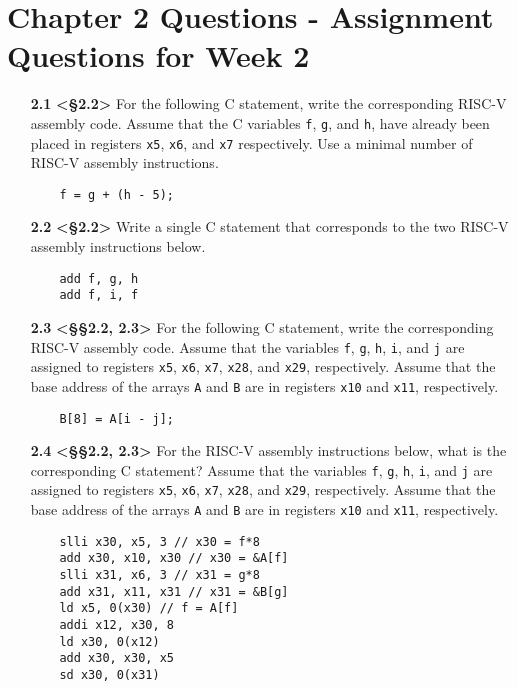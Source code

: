 \documentclass[11pt]{article}
\begin{document}
\section*{Chapter 2 Questions - Assignment Questions for Week 2}

\begin{enumerate}
    \item[\textbf{2.1}] \textbf{<§2.2>} For the following C statement, write the corresponding RISC-V 
    assembly code. Assume that the C variables \texttt{f}, \texttt{g}, and \texttt{h}, have already been placed 
    in registers \texttt{x5}, \texttt{x6}, and \texttt{x7} respectively. Use a minimal number of RISC-V assembly 
    instructions.
    \begin{verbatim}
    f = g + (h - 5);
    \end{verbatim}

    \item[\textbf{2.2}] \textbf{<§2.2>} Write a single C statement that corresponds to the two RISC-V 
    assembly instructions below.
    \begin{verbatim}
    add f, g, h
    add f, i, f
    \end{verbatim}

    \item[\textbf{2.3}] \textbf{<§§2.2, 2.3>} For the following C statement, write the corresponding 
    RISC-V assembly code. Assume that the variables \texttt{f}, \texttt{g}, \texttt{h}, \texttt{i}, and \texttt{j} are assigned to 
    registers \texttt{x5}, \texttt{x6}, \texttt{x7}, \texttt{x28}, and \texttt{x29}, respectively. Assume that the base address 
    of the arrays \texttt{A} and \texttt{B} are in registers \texttt{x10} and \texttt{x11}, respectively.
    \begin{verbatim}
    B[8] = A[i - j];
    \end{verbatim}

    \item[\textbf{2.4}] \textbf{<§§2.2, 2.3>} For the RISC-V assembly instructions below, what is the 
    corresponding C statement? Assume that the variables \texttt{f}, \texttt{g}, \texttt{h}, \texttt{i}, and \texttt{j} are assigned 
    to registers \texttt{x5}, \texttt{x6}, \texttt{x7}, \texttt{x28}, and \texttt{x29}, respectively. Assume that the base 
    address of the arrays \texttt{A} and \texttt{B} are in registers \texttt{x10} and \texttt{x11}, respectively.
    \begin{verbatim}
    slli x30, x5, 3 // x30 = f*8
    add x30, x10, x30 // x30 = &A[f]
    slli x31, x6, 3 // x31 = g*8
    add x31, x11, x31 // x31 = &B[g]
    ld x5, 0(x30) // f = A[f]
    addi x12, x30, 8
    ld x30, 0(x12)
    add x30, x30, x5
    sd x30, 0(x31)
    \end{verbatim}


\end{enumerate}
\end{document}

